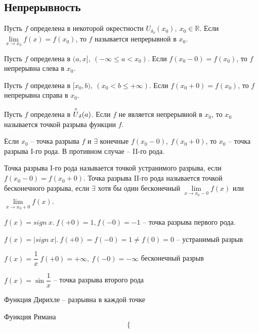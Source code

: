 \begin{multicols}{2}
\subsection*{Непрерывность}
\begin{definition}{}{}
     Пусть $f$ определена в некоторой окрестности $U_{\delta_0}(x_0),\ x_0\in\mathbb R.$ Если $\lim\limits_{x\to x_0} f(x) = f(x_0)$, то $f$ называется непрерывной в $x_0$.
\end{definition}
\begin{definition}{}{}
     Пусть $f$ определена в $(a,x],\ (-\infty \leq a < x_0)$. Если $f(x_0 - 0) = f(x_0)$, то $f$ непрерывна слева в $x_0$.
\end{definition}
\begin{definition}{}{}
     Пусть $f$ определена в $[x_0, b),\ (x_0 < b \leq +\infty)$. Если $f(x_0+0) = f(x_0)$, то $f$ непрерывна справа в $x_0$.
\end{definition}
\begin{definition}{}{}
     Пусть $f$ определена в $\overset{\circ}{U}_\delta(a)$. Если $f$ не является непрерывной в $x_0$, то $x_0$ называется точкой разрыва функции $f$. 
\end{definition}
\begin{definition}{}{}
     Если $x_0$ -- точка разрыва $f$ и $\exists$ конечные $f(x_0-0),\ f(x_0+0)$, то $x_0$ -- точка разрыва I-го рода. В противном случае -- II-го рода.
\end{definition}
\begin{definition}{}{}
     Точка разрыва I-го рода называется точкой устранимого разрыва, если $f(x_0 - 0) = f(x_0 + 0)$. Точка разрыва II-го рода называется точкой бесконечного разрыва, если $\exists$ хотя бы один бесконечный $\lim\limits_{x\to x_0 - 0} f(x)$ или $\lim\limits_{x\to x_0 + 0} f(x)$.
\end{definition}
\Ex \begin{enumerate*}
	\item  $f(x) = sign\ x.\ f(+0) = 1, f(-0) = -1$ -- точка разрыва первого рода. \item $f(x) = |sign\ x|.\ f(+0) = f(-0) = 1 \neq f(0) = 0$ -- устранимый разрыв
	\item $f(x) = \dfrac{1}{x}\ f(+0) = +\infty,\ f(-0) = -\infty$ бесконечный разрыв
	\item $f(x) = \sin\dfrac{1}{x}$ -- точка разрыва второго рода
	\item Функция Дирихле -- разрывна в каждой точке
	\item Функция Римана \[
		\begin{cases}

\end{cases}\]
\end{enumerate*}
\end{multicols}
